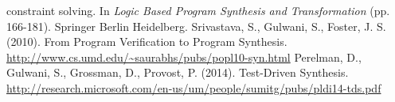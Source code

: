 \documentclass[a4paper,twoside,notitlepage]{report}
\begin{document}
\begin{thebibliography}{9}
        constraint solving. In \emph{Logic Based Program Synthesis and 
        Transformation} (pp. 166-181). Springer Berlin Heidelberg.
        Srivastava, S., Gulwani, S., Foster, J. S. (2010).
        From Program Verification to Program Synthesis.
        \url{http://www.cs.umd.edu/~saurabhs/pubs/popl10-syn.html}
        Perelman, D., Gulwani, S., Grossman, D., Provost, P. (2014).
        Test-Driven Synthesis.
        \url{http://research.microsoft.com/en-us/um/people/sumitg/pubs/pldi14-tds.pdf}
\begin{comment}
    \bibitem{muggleton94}
        Muggleton, S., De Raedt, L. (1994).
        Inductive Logic Programming: Theory and methods.
        The Journal of Logic Programming, vol. 19-20, page 629-679.
    \bibitem{potassco}
        Potassco, the Potsdam Answer Set Solving Collection. 
        \url{http://potassco.sourceforge.net}
    \bibitem{glimpse}
        Anger, C., Konczak, K., Linke, T., Schaub, T. (2005).
        A Glimpse of Answer Set Programming.
        \url{http://www.cs.uni-potsdam.de/wv/pdfformat/ankolisc05.pdf}
    \bibitem{aspal}
        Corapi, D., Russo, A., Lupu, E. (2011).
        Inductive Logic Programming in Answer Set Programming.
        \url{http://ilp11.doc.ic.ac.uk/short_papers/ilp2011_submission_20.pdf}
    \bibitem{ilasp}
        Law, M., Russo, A., Broda, K. (2014).
        Inductive learning of answer set programs.
        \url{https://www.doc.ic.ac.uk/~ml1909/ILASP_Paper.pdf}
\end{comment}
\end{thebibliography}
\end{document}
